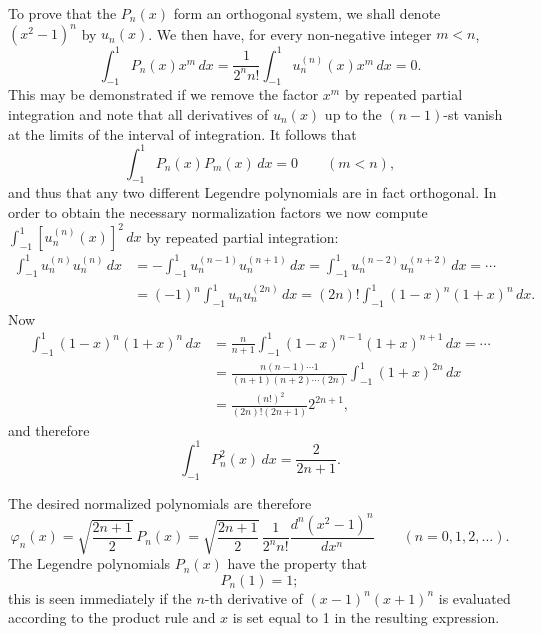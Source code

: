 To prove that the $P_n(x)$ form an orthogonal system, we shall denote $(x^2-1)^n$ by $u_n(x)$. We then have, for every non-negative integer $m<n$,
\[
\int_{-1}^{1}P_n(x)x^m\,dx
=\frac1{2^n n!}\int_{-1}^{1}u_n^{(n)}(x)x^m\,dx=0.
\]
This may be demonstrated if we remove the factor $x^m$ by repeated partial integration and note that all derivatives of $u_n(x)$ up to the $(n-1)$-st vanish at the limits of the interval of integration. It follows that
\[
\int_{-1}^{1}P_n(x)P_m(x)\,dx=0\qquad(m<n),
\]
and thus that any two different Legendre polynomials are in fact orthogonal. In order to obtain the necessary normalization factors we now compute $\int_{-1}^{1}[u_n^{(n)}(x)]^2\,dx$ by repeated partial integration:
\[
\begin{aligned}
\int_{-1}^{1}u_n^{(n)}u_n^{(n)}\,dx
&=-\int_{-1}^{1}u_n^{(n-1)}u_n^{(n+1)}\,dx
=\int_{-1}^{1}u_n^{(n-2)}u_n^{(n+2)}\,dx=\cdots\\
&=(-1)^n\int_{-1}^{1}u_nu_n^{(2n)}\,dx
=(2n)!\int_{-1}^{1}(1-x)^n(1+x)^n\,dx.
\end{aligned}
\]
Now
\[
\begin{aligned}
\int_{-1}^{1}(1-x)^n(1+x)^n\,dx
&=\frac{n}{n+1}\int_{-1}^{1}(1-x)^{n-1}(1+x)^{n+1}\,dx=\cdots\\
&=\frac{n(n-1)\cdots1}{(n+1)(n+2)\cdots(2n)}\int_{-1}^{1}(1+x)^{2n}\,dx\\
&=\frac{(n!)^2}{(2n)!(2n+1)}2^{2n+1},
\end{aligned}
\]
and therefore
\[
\int_{-1}^{1}P_n^2(x)\,dx=\frac{2}{2n+1}.
\]

The desired normalized polynomials are therefore
\[
\varphi_n(x)=\sqrt{\frac{2n+1}{2}}\,P_n(x)
=\sqrt{\frac{2n+1}{2}}\,\frac{1}{2^n n!}\frac{d^n(x^2-1)^n}{dx^n}
\qquad(n=0,1,2,\ldots).
\]
The Legendre polynomials $P_n(x)$ have the property that
\[
P_n(1)=1;
\]
this is seen immediately if the $n$-th derivative of $(x-1)^n(x+1)^n$ is evaluated according to the product rule and $x$ is set equal to 1 in the resulting expression.


